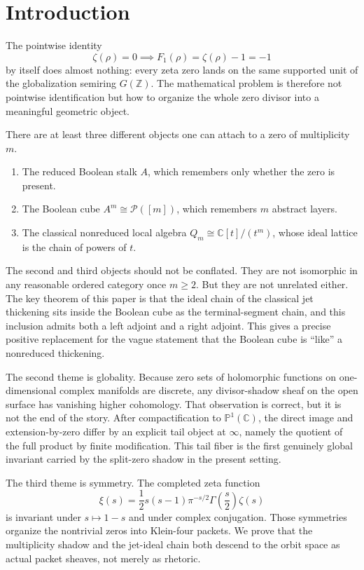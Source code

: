 \documentclass[11pt,a4paper]{article}
\theoremstyle{definition}
\theoremstyle{remark}
\newcommand{\ZZ}{\mathbb Z}
\newcommand{\CC}{\mathbb C}
\newcommand{\PP}{\mathbb P}
\newcommand{\cP}{\mathcal P}
\begin{document}
\tableofcontents

\section{Introduction}

The pointwise identity
\[
\zeta(\rho)=0\implies F_1(\rho)=\zeta(\rho)-1=-1
\]
by itself does almost nothing: every zeta zero lands on the same supported unit of the globalization semiring $G(\ZZ)$.  The mathematical problem is therefore not pointwise identification but how to organize the whole zero divisor into a meaningful geometric object.

There are at least three different objects one can attach to a zero of multiplicity $m$.

\begin{enumerate}[label=(\roman*)]
\item The reduced Boolean stalk $A$, which remembers only whether the zero is present.
\item The Boolean cube $A^m\cong\cP([m])$, which remembers $m$ abstract layers.
\item The classical nonreduced local algebra $Q_m\cong \CC[t]/(t^m)$, whose ideal lattice is the chain of powers of $t$.
\end{enumerate}

The second and third objects should not be conflated.  They are not isomorphic in any reasonable ordered category once $m\ge2$.  But they are not unrelated either.  The key theorem of this paper is that the ideal chain of the classical jet thickening sits inside the Boolean cube as the terminal-segment chain, and this inclusion admits both a left adjoint and a right adjoint.  This gives a precise positive replacement for the vague statement that the Boolean cube is ``like'' a nonreduced thickening.

The second theme is globality.  Because zero sets of holomorphic functions on one-dimensional complex manifolds are discrete, any divisor-shadow sheaf on the open surface has vanishing higher cohomology.  That observation is correct, but it is not the end of the story.  After compactification to $\PP^1(\CC)$, the direct image and extension-by-zero differ by an explicit tail object at $\infty$, namely the quotient of the full product by finite modification.  This tail fiber is the first genuinely global invariant carried by the split-zero shadow in the present setting.

The third theme is symmetry.  The completed zeta function
\[
\xi(s)=\frac12 s(s-1)\pi^{-s/2}\Gamma\!\left(\frac s2\right)\zeta(s)
\]
is invariant under $s\mapsto 1-s$ and under complex conjugation.  Those symmetries organize the nontrivial zeros into Klein-four packets.  We prove that the multiplicity shadow and the jet-ideal chain both descend to the orbit space as actual packet sheaves, not merely as rhetoric.
\end{document}
